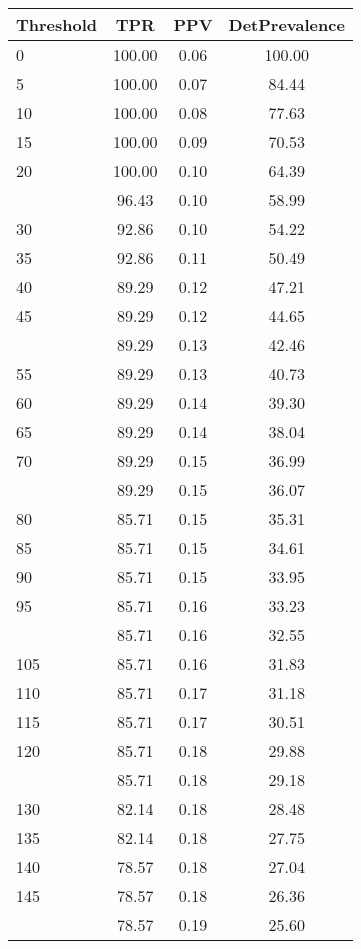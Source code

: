 \begin{table}[ht]
\centering
\begin{tabular}{lccc}
  \toprule
Threshold & TPR & PPV & DetPrevalence \\ 
  \midrule
0 & 100.00 & 0.06 & 100.00 \\ 
  5 & 100.00 & 0.07 & 84.44 \\ 
  10 & 100.00 & 0.08 & 77.63 \\ 
  15 & 100.00 & 0.09 & 70.53 \\ 
  20 & 100.00 & 0.10 & 64.39 \\ 
   \addlinespace
25 & 96.43 & 0.10 & 58.99 \\ 
  30 & 92.86 & 0.10 & 54.22 \\ 
  35 & 92.86 & 0.11 & 50.49 \\ 
  40 & 89.29 & 0.12 & 47.21 \\ 
  45 & 89.29 & 0.12 & 44.65 \\ 
   \addlinespace
50 & 89.29 & 0.13 & 42.46 \\ 
  55 & 89.29 & 0.13 & 40.73 \\ 
  60 & 89.29 & 0.14 & 39.30 \\ 
  65 & 89.29 & 0.14 & 38.04 \\ 
  70 & 89.29 & 0.15 & 36.99 \\ 
   \addlinespace
75 & 89.29 & 0.15 & 36.07 \\ 
  80 & 85.71 & 0.15 & 35.31 \\ 
  85 & 85.71 & 0.15 & 34.61 \\ 
  90 & 85.71 & 0.15 & 33.95 \\ 
  95 & 85.71 & 0.16 & 33.23 \\ 
   \addlinespace
100 & 85.71 & 0.16 & 32.55 \\ 
  105 & 85.71 & 0.16 & 31.83 \\ 
  110 & 85.71 & 0.17 & 31.18 \\ 
  115 & 85.71 & 0.17 & 30.51 \\ 
  120 & 85.71 & 0.18 & 29.88 \\ 
   \addlinespace
125 & 85.71 & 0.18 & 29.18 \\ 
  130 & 82.14 & 0.18 & 28.48 \\ 
  135 & 82.14 & 0.18 & 27.75 \\ 
  140 & 78.57 & 0.18 & 27.04 \\ 
  145 & 78.57 & 0.18 & 26.36 \\ 
   \addlinespace
150 & 78.57 & 0.19 & 25.60 \\ 

\end{tabular}
\end{table}
